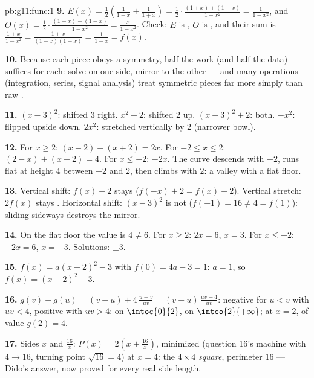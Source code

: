 \begin{solution}{pb:g11:func:1}
\textbf{9.} $E(x) = \frac12\left(\frac{1}{1 - x} + \frac{1}{1 +
x}\right) = \frac12 \cdot \frac{(1 + x) + (1 - x)}{1 - x^2}
= \frac{1}{1 - x^2}$, and
$O(x) = \frac12 \cdot \frac{(1 + x) - (1 - x)}{1 - x^2}
= \frac{x}{1 - x^2}$. Check: $E$ is , $O$ is , and
their sum is $\frac{1 + x}{1 - x^2} =
\frac{1 + x}{(1 - x)(1 + x)} = \frac{1}{1 - x} = f(x)$.

\textbf{10.} Because each piece obeys a symmetry, half the
work (and half the data) suffices for each: solve on one side,
mirror to the other --- and many operations (integration,
series, signal analysis) treat symmetric pieces far more
simply than raw .

\textbf{11.} $(x-3)^2$: shifted $3$ right. $x^2 + 2$: shifted
$2$ up. $(x-3)^2 + 2$: both. $-x^2$: flipped upside down.
$2x^2$: stretched vertically by $2$ (narrower bowl).

\textbf{12.} For $x \geq 2$: $(x - 2) + (x + 2) = 2x$. For
$-2 \leq x \leq 2$: $(2 - x) + (x + 2) = 4$. For $x \leq -2$:
$-2x$. The curve descends with  $-2$, runs flat at height
$4$ between $-2$ and $2$, then climbs with  $2$: a valley
with a flat floor.

\textbf{13.} Vertical shift: $f(x) + 2$ stays 
($f(-x) + 2 = f(x) + 2$). Vertical stretch: $2f(x)$ stays
. Horizontal shift: $(x - 3)^2$ is not 
($f(-1) = 16 \neq 4 = f(1)$): sliding sideways destroys the
mirror.

\textbf{14.} On the flat floor the value is $4 \neq 6$. For
$x \geq 2$: $2x = 6$, $x = 3$. For $x \leq -2$: $-2x = 6$,
$x = -3$. Solutions: $\pm 3$.

\textbf{15.} $f(x) = a(x - 2)^2 - 3$ with $f(0) = 4a - 3 = 1$:
$a = 1$, so $f(x) = (x - 2)^2 - 3$.

\textbf{16.} $g(v) - g(u) = (v - u) + 4\,\frac{u - v}{uv}
= (v - u)\,\frac{uv - 4}{uv}$: negative for $u < v$ with
$uv < 4$, positive with $uv > 4$:  on
$\intoc{0}{2}$,  on $\intco{2}{+\infty}$;  at
$x = 2$, of value $g(2) = 4$.

\textbf{17.} Sides $x$ and $\frac{16}{x}$:
$P(x) = 2\left(x + \frac{16}{x}\right)$, minimized (question
16's machine with $4 \to 16$, turning point $\sqrt{16} = 4$)
at $x = 4$: the $4 \times 4$ \emph{square}, perimeter $16$ ---
Dido's answer, now proved for every real side length.


\end{solution}
